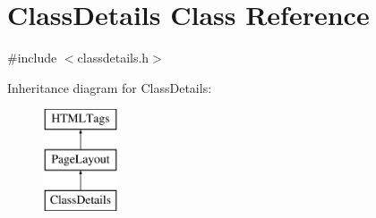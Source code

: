 \hypertarget{classClassDetails}{\section{Class\-Details Class Reference}
\label{classClassDetails}
}


{\ttfamily \#include $<$classdetails.\-h$>$}

Inheritance diagram for Class\-Details\-:\begin{figure}[H]
\begin{center}
\leavevmode
\includegraphics[height=3.000000cm]{classClassDetails}
\end{center}
\end{figure}
